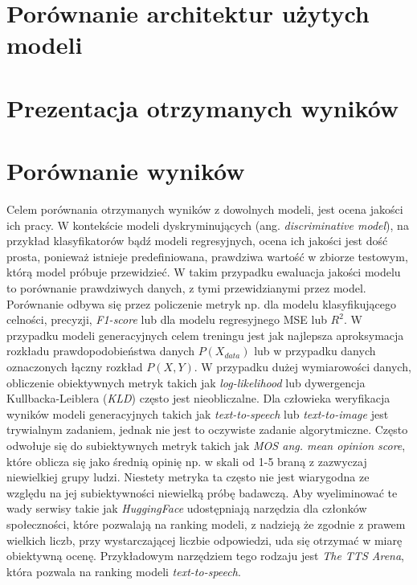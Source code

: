 \documentclass[data-science]{agh-wi} %
\begin{document}
\section{Porównanie architektur użytych modeli}
\section{Prezentacja otrzymanych wyników}
\section{Porównanie wyników}
Celem porównania otrzymanych wyników z dowolnych modeli, jest ocena jakości ich pracy. W kontekście modeli dyskryminujących (ang. \textit{discriminative model}), na przykład klasyfikatorów bądź modeli regresyjnych, ocena ich jakości jest dość prosta, ponieważ istnieje predefiniowana, prawdziwa wartość w zbiorze testowym, którą model próbuje przewidzieć. W takim przypadku ewaluacja jakości modelu to porównanie prawdziwych danych, z tymi przewidzianymi przez model. Porównanie odbywa się przez policzenie metryk np. dla modelu klasyfikującego celności, precyzji, \textit{F1-score} lub dla modelu regresyjnego MSE lub $R^2$. W przypadku modeli generacyjnych celem treningu jest jak najlepsza aproksymacja rozkładu prawdopodobieństwa danych $P(X_{data})$ lub w przypadku danych oznaczonych łączny rozkład $P(X, Y)$. W przypadku dużej wymiarowości danych, obliczenie obiektywnych metryk takich jak \textit{log-likelihood} lub dywergencja Kullbacka-Leiblera (\textit{KLD}) często jest nieobliczalne. Dla człowieka weryfikacja wyników modeli generacyjnych takich jak \textit{text-to-speech} lub \textit{text-to-image} jest trywialnym zadaniem, jednak nie jest to oczywiste zadanie algorytmiczne. Często odwołuje się do subiektywnych metryk takich jak \textit{MOS ang. mean opinion score}, które oblicza się jako średnią opinię np. w skali od 1-5 braną z zazwyczaj niewielkiej grupy ludzi. Niestety metryka ta często nie jest wiarygodna ze względu na jej subiektywności niewielką próbę badawczą. Aby wyeliminować te wady serwisy takie jak \textit{HuggingFace} udostępniają narzędzia dla członków społeczności, które pozwalają na ranking modeli, z nadzieją że zgodnie z prawem wielkich liczb, przy wystarczającej liczbie odpowiedzi, uda się otrzymać w miarę obiektywną ocenę. Przykładowym narzędziem tego rodzaju jest \textit{The TTS Arena}\cite{tts_arena}, która pozwala na ranking modeli \textit{text-to-speech}.
\end{document}

